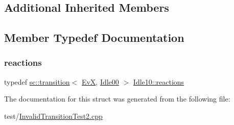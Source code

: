 \subsection*{Additional Inherited Members}


\subsection{Member Typedef Documentation}
\mbox{\label{struct_idle10_a1d49901702603a8324b8bac9b757476c}} 
\subsubsection{\texorpdfstring{reactions}{reactions}}
{\footnotesize\ttfamily typedef \mbox{\hyperlink{classboost_1_1statechart_1_1transition}{sc\+::transition}}$<$ \mbox{\hyperlink{struct_ev_x}{EvX}}, \mbox{\hyperlink{struct_idle00}{Idle00}} $>$ \mbox{\hyperlink{struct_idle10_a1d49901702603a8324b8bac9b757476c}{Idle10\+::reactions}}}



The documentation for this struct was generated from the following file\+:\begin{DoxyCompactItemize}
\item 
test/\mbox{\hyperlink{_invalid_transition_test2_8cpp}{Invalid\+Transition\+Test2.\+cpp}}\end{DoxyCompactItemize}
